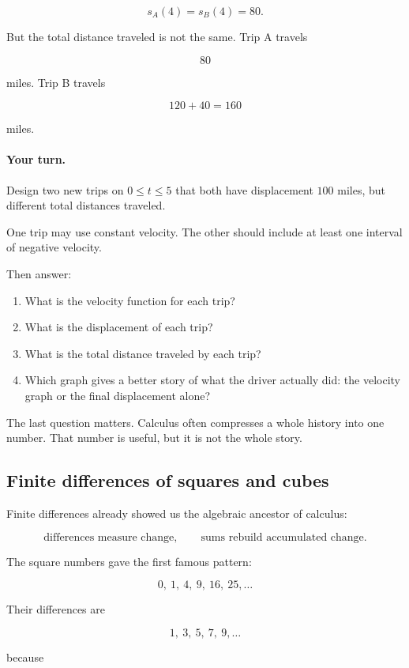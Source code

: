 \[
s_A(4)=s_B(4)=80.
\]

But the total distance traveled is not the same. Trip A travels

\[
80
\]

miles. Trip B travels

\[
120+40=160
\]

miles.

\paragraph{Your turn.}
Design two new trips on \(0\leq t\leq 5\) that both have displacement \(100\) miles, but different total distances traveled.

One trip may use constant velocity. The other should include at least one interval of negative velocity.

Then answer:

\begin{enumerate}
\item What is the velocity function for each trip?
\item What is the displacement of each trip?
\item What is the total distance traveled by each trip?
\item Which graph gives a better story of what the driver actually did: the velocity graph or the final displacement alone?
\end{enumerate}

The last question matters. Calculus often compresses a whole history into one number. That number is useful, but it is not the whole story.

\subsection{Finite differences of squares and cubes}
\label{subsec:finite-differences-squares-cubes}

Finite differences already showed us the algebraic ancestor of calculus:

\[
\text{differences measure change},
\qquad
\text{sums rebuild accumulated change}.
\]

The square numbers gave the first famous pattern:

\[
0,\ 1,\ 4,\ 9,\ 16,\ 25,\ldots
\]

Their differences are

\[
1,\ 3,\ 5,\ 7,\ 9,\ldots
\]

because

